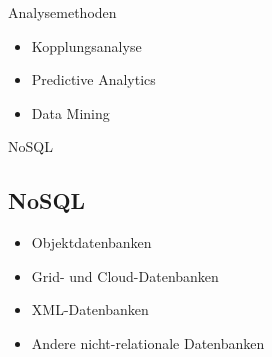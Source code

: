 \documentclass[11pt]{beamer}
\begin{document}
\begin{frame}{Analysemethoden}
\begin{itemize}
\item Kopplungsanalyse
\item Predictive Analytics
\item Data Mining
\end{itemize}
\end{frame}


%

\begin{frame}{NoSQL}
\subsection{NoSQL}
\begin{itemize}
\item Objektdatenbanken
\item Grid- und Cloud-Datenbanken
\item XML-Datenbanken
\item Andere nicht-relationale Datenbanken
\end{itemize}
\end{frame}
\end{document}
